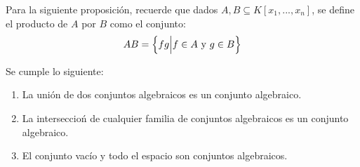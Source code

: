 \documentclass[12pt]{report}
\theoremstyle{largebreak}
\begin{document}
    Para la siguiente proposición, recuerde que dados $A,B\subseteq K[x_1,...,x_n]$, se define el producto de $A$ por $B$ como el conjunto:
    \begin{equation*}
        AB=\left\{fg\Big|f\in A\textup{ y }g\in B \right\}
    \end{equation*}
    
    \begin{propo}
        Se cumple lo siguiente:
        \begin{enumerate}[label=(\textit{\alph*})]
            \item La unión de dos conjuntos algebraicos es un conjunto algebraico.
            \item La interseccioń de cualquier familia de conjuntos algebraicos es un conjunto algebraico.
            \item El conjunto vacío y todo el espacio son conjuntos algebraicos.
        \end{enumerate}
    \end{propo}
\end{document}
